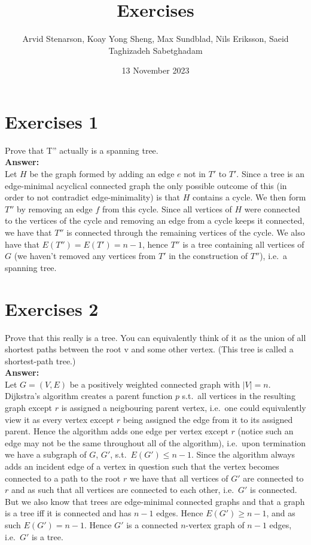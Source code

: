 \documentclass[nobib]{tufte-handout}
\title{Exercises}
\author[Group 2]{Arvid Stenarson, Koay Yong Sheng, Max Sundblad, Nils Eriksson, Saeid Taghizadeh Sabetghadam}%
\date{13 November 2023}
\begin{document}
\maketitle%

\section{Exercises 1}
    Prove that T'' actually is a spanning tree. \\ 

    \textbf{Answer:} \\ 
    Let $H$ be the graph formed by adding an edge $e$ not in $T'$ to $T'$. Since a tree is an edge-minimal acyclical connected graph the only possible outcome of this (in order to not contradict edge-minimality) is that $H$ contains a cycle. We then form $T''$ by removing an edge $f$ from this cycle. Since all vertices of $H$ were connected to the vertices of the cycle and removing an edge from a cycle keeps it connected, we have that $T''$ is connected through the remaining vertices of the cycle. We also have that $E(T'') = E(T') = n - 1$, hence $T''$ is a tree containing all vertices of $G$ (we haven't removed any vertices from $T'$ in the construction of $T''$), i.e.\ a spanning tree.

\newpage

\section{Exercises 2}
  Prove that this really is a tree. You can equivalently think of it as the union of all shortest paths between the root v and some other vertex. (This tree is called a shortest-path tree.) \\
  
  \textbf{Answer:} \\ 
  Let $G = (V, E)$ be a positively weighted connected graph with $|V| = n$. Dijkstra's algorithm creates a parent function $p$ s.t.\ all vertices in the resulting graph except $r$ is assigned a neigbouring parent vertex, i.e.\ one could equivalently view it as every vertex except $r$ being assigned the edge from it to its assigned parent. Hence the algorithm adds one edge per vertex except $r$ (notice such an edge may not be the same throughout all of the algorithm), i.e.\ upon termination we have a subgraph of $G$, $G'$, s.t.\ $E(G') \leq n - 1$. Since the algorithm always adds an incident edge of a vertex in question such that the vertex becomes connected to a path to the root $r$ we have that all vertices of $G'$ are connected to $r$ and as such that all vertices are connected to each other, i.e.\ $G'$ is connected. But we also know that trees are edge-minimal connected graphs and that a graph is a tree iff it is connected and has $n - 1$ edges. Hence $E(G') \geq n - 1$, and as such $E(G') = n - 1$. Hence $G'$ is a connected $n$-vertex graph of $n - 1$ edges, i.e.\ $G'$ is a tree.
\newpage
\end{document}
